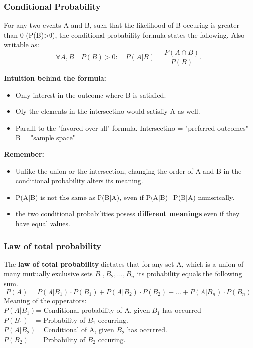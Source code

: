 \documentclass{article}
\begin{document}
\subsubsection{Conditional Probability}
For any two events A and B, such that the likelihood of B occuring is greater
than 0 (P(B)>0), the conditional probability formula states the following.
Also writable as: $$\forall A, B \quad P(B)>0:\quad P(A|B)=\frac{P(A\cap B)}{P(B)}.$$

\textbf{Intuition behind the formula:}
\begin{itemize}
  \item Only interest in the outcome where B is satisfied.
  \item Oly the elements in the intersectino would satisfly A as well.
  \item Paralll to the "favored over all" formula.
    \subitem Intersectino = "preferred outcomes"
    \subitem B = "sample space"
\end{itemize}

\textbf{Remember:}
\begin{itemize}
  \item Unlike the union or the intersection, changing the order of A and B in
    the conditional probability alters its meaning.
  \item P(A|B) is not the same as P(B|A), even if P(A|B)=P(B|A) numerically.
  \item the two conditional probabilities posess \textbf{different meanings}
    even if they have equal values.
\end{itemize}

\subsubsection{Law of total probability}
The \textbf{law of total probability} dictates that for any set A, which is a
union of many mutually exclusive sets $B_1, B_2, ..., B_n$ its probability
equals the following sum.
\[P(A)=P(A|B_1)\cdot P(B_1)+P(A|B_2)\cdot P(B_2) + \dots + P(A|B_n) \cdot P(B_n)\]
Meaning of the opperators:\\
$P(A|B_1)$= Conditional probability of A, given $B_1$ has occurred.\\
$P(B_1)\quad$= Probability of $B_1$ occurring.\\
$P(A|B_2)$= Conditional of A, given $B_2$ has occurred.\\
$P(B_2)\quad$= Probability of $B_2$ occuring.
\end{document}

